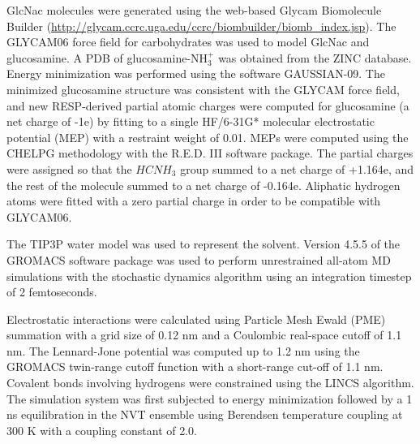 GlcNac molecules were generated using the web-based Glycam Biomolecule Builder (\url{http://glycam.ccrc.uga.edu/ccrc/biombuilder/biomb_index.jsp}). The GLYCAM06 force field for carbohydrates\cite{Kirschner:2008ii} was used to model GlcNac and glucosamine. A PDB of glucosamine-$\textrm{NH}_{3}^{+}$ was obtained from the ZINC database.\cite{Irwin:2005kx} Energy minimization was performed using the software GAUSSIAN-09.\cite{g09} The minimized glucosamine structure was consistent with the GLYCAM force field, and new RESP-derived partial atomic charges were computed for glucosamine (a net charge of -1e) by fitting to a single HF/6-31G* molecular electrostatic potential (MEP) with a restraint weight of 0.01. MEPs were computed using the CHELPG methodology\cite{Breneman:1990ue} with the R.E.D. III software package.\cite{Dupradeau:2010bb} The partial charges were assigned so that the $HCNH_{3}$ group summed to a net charge of +1.164e, and the rest of the molecule summed to a net charge of -0.164e. Aliphatic hydrogen atoms were fitted with a zero partial charge in order to be compatible with GLYCAM06.


The TIP3P water model was used to represent the solvent. Version 4.5.5 of the GROMACS software package\cite{Pronk:2013ef,Hess:2008p5353} was used to perform unrestrained all-atom MD simulations with the stochastic dynamics algorithm using an integration timestep of 2 femtoseconds.

Electrostatic interactions were calculated using Particle Mesh Ewald (PME) summation with a grid size of 0.12 nm and a Coulombic real-space cutoff of 1.1 nm. The Lennard-Jone potential was computed up to 1.2 nm using the GROMACS twin-range cutoff function with a short-range cut-off of 1.1 nm. Covalent bonds involving hydrogens were constrained using the LINCS algorithm. The simulation system was first subjected to energy minimization followed by a 1 ns equilibration in the NVT ensemble using Berendsen temperature coupling at 300 K with a coupling constant of 2.0.

